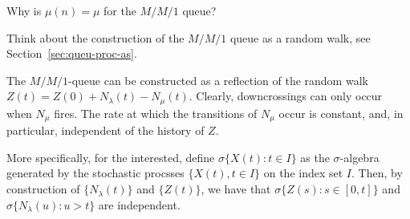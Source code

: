 \begin{exercise}
  Why is $\mu(n) = \mu$ for the $M/M/1$ queue?  
  \begin{hint}
Think about the
    construction of the $M/M/1$ queue as a random walk, see
    Section~\ref{sec:queu-proc-as}.
  \end{hint}
 \begin{solution}
   The $M/M/1$-queue can be constructed as a reflection of the random
   walk $Z(t) = Z(0) + N_\lambda(t) - N_\mu(t)$. Clearly,
   downcrossings can only occur when $N_\mu$ fires. The rate at which
   the transitions of $N_\mu$ occur is constant, and, in particular,
   independent of the history of $Z$. 

   More specifically, for the interested, define
   $\sigma\{X(t) : t\in I\}$ as the $\sigma$-algebra generated by the
   stochastic procsses $\{X(t), t\in I\}$ on the index set $I$. Then,
   by construction of $\{N_\lambda(t)\}$ and $\{Z(t)\}$, we have that
   $\sigma\{Z(s) : s\in[0,t]\}$  and $\sigma\{N_\lambda(u) : u > t\}$ are independent.
 \end{solution}
\end{exercise}


